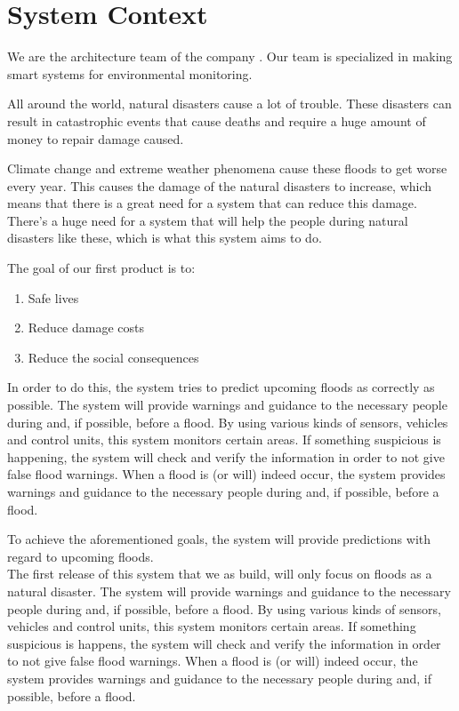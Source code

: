 \chapter{System Context}
\label{ch:context}

We are the architecture team of the company \CompanyName. Our team is specialized in making smart systems for environmental monitoring.

All around the world, natural disasters cause a lot of trouble. These disasters can result in catastrophic events that cause deaths and require a huge amount of money to repair damage caused.

Climate change and extreme weather phenomena cause these floods to get worse every year. This causes the damage of the natural disasters to increase, which means that there is a great need for a system that can reduce this damage. There's a huge need for a system that will help the people during natural disasters like these, which is what this system aims to do.


The goal of our first product is to:
\begin{enumerate}
  \item Safe lives
  \item Reduce damage costs
  \item Reduce the social consequences
\end{enumerate}

In order to do this, the system tries to predict upcoming floods as correctly as possible. The system will provide warnings and guidance to the necessary people during and, if possible, before a flood. By using various kinds of sensors, vehicles and control units, this system monitors certain areas. If something suspicious is happening, the system will check and verify the information in order to not give false flood warnings. When a flood is (or will) indeed occur, the system   provides warnings and guidance to the necessary people during and, if possible, before a flood. 

To achieve the aforementioned goals, the system will provide predictions with regard to upcoming floods.\\

The first release of this system that we as \CompanyName build, will only focus on floods as a natural disaster. The system will provide warnings and guidance to the necessary people during and, if possible, before a flood. By using various kinds of sensors, vehicles and control units, this system monitors certain areas. If something suspicious is happens, the system will check and verify the information in order to not give false flood warnings. When a flood is (or will) indeed occur, the system   provides warnings and guidance to the necessary people during and, if possible, before a flood. 


